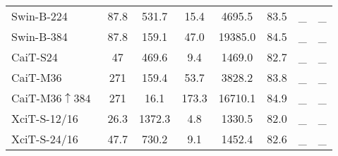 \begin{table}[t]
{\begin{tabular}{lcccc|ccc}
    Swin-B-224~\cite{liu2021swin} & 87.8  & 531.7 & 15.4 & 4695.5 & 83.5 & \_  &  \_ \\
    Swin-B-384~\cite{liu2021swin} & 87.8  & 159.1 & 47.0 & 19385.0 & 84.5 & \_  &  \_ \\
    \midrule
	CaiT-S24~\cite{touvron2021going}         & 47 & 469.6 & 9.4 & 1469.0 & 82.7 & \_ & \_ \\
	
	CaiT-M36~\cite{touvron2021going}         & 271  & 159.4 & 53.7 & 3828.2 & 83.8 & \_ & \_\\
    CaiT-M36$\uparrow 384$~\cite{touvron2021going}         & 271  & 16.1 & 173.3 &   16710.1& 84.9 & \_ & \_\\
	
	
	
    \midrule
	
    XciT-S-12/16~\cite{el2021xcit} & 26.3 & 1372.3 & 4.8  & 1330.5 & 82.0 & \_  & \_ \\
    XciT-S-24/16~\cite{el2021xcit} & 47.7 & 730.2 & 9.1  & 1452.4 & 82.6 & \_  & \_\\
    


\end{tabular}}
\end{table}
